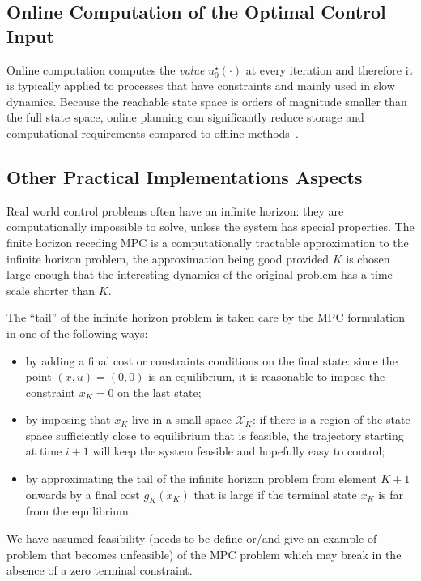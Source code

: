 \subsection{Online Computation of the Optimal Control Input}
\label{sec:online-computation-MPC}

Online computation computes the \emph{value} $u_0^\star(\cdot)$ at every iteration and therefore it is typically applied to processes that have constraints and mainly used in slow dynamics. Because the reachable state space is orders of magnitude smaller than the full state space, online planning can significantly reduce storage and computational requirements compared to offline methods~\cite[Sect.~9]{decision-making-kochenderfer}.

\subsection{Other Practical Implementations Aspects}
\label{sec:other-practical-implementation-aspects}

Real world control problems often have an infinite horizon: they are computationally impossible to solve, unless the system has special properties. The finite horizon receding MPC is a computationally tractable approximation to the infinite horizon problem, the approximation being good provided $K$ is chosen large enough that the interesting dynamics of the original problem has a time-scale shorter than $K$.

The ``tail'' of the infinite horizon problem is taken care by the MPC formulation in one of the following ways:
\begin{itemize}
\item by adding a final cost or constraints conditions on the final state: since the point $(x,u)=(0,0)$ is an equilibrium, it is reasonable to impose the constraint $x_K=0$ on the last state;
\item by imposing that $x_K$ live in a small space $\mathcal{X}_K$: if there is a region of the state space sufficiently close to equilibrium that is feasible, the trajectory starting at time $i+1$ will keep the system feasible and hopefully easy to control;
\item by approximating the tail of the infinite horizon problem from element $K+1$ onwards by a final cost $g_K(x_K)$ that is large if the terminal state $x_K$ is far from the equilibrium.
\end{itemize}

We have assumed feasibility (needs to be define or/and give an example of problem that becomes unfeasible) of the MPC problem which may break in the absence of a zero terminal constraint.

